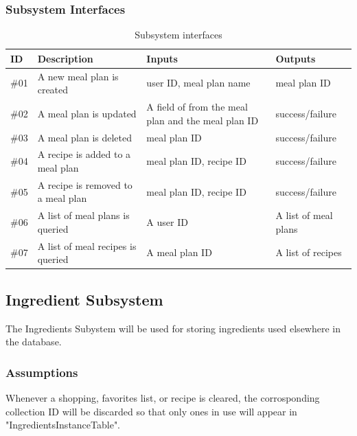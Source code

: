 \subsubsection{Subsystem Interfaces}
\begin {table}[H]
\caption {Subsystem interfaces} 
\begin{center}
    \begin{tabular}{ | p{1cm} | p{6cm} | p{3cm} | p{3cm} |}
    \hline
    ID & Description & Inputs & Outputs \\ \hline
    \#01 & A new meal plan is created & user ID, meal plan name & meal plan ID  \\ \hline
    \#02 & A meal plan is updated & A field of from the meal plan and the meal plan ID & success/failure  \\ \hline
    \#03 & A meal plan is deleted & meal plan ID & success/failure  \\ \hline
    \#04 & A recipe is added to a meal plan & meal plan ID, recipe ID & success/failure  \\ \hline
    \#05 & A recipe is removed to a meal plan & meal plan ID, recipe ID & success/failure  \\ \hline
    \#06 & A list of meal plans is queried & A user ID & A list of meal plans  \\ \hline
    \#07 & A list of meal recipes is queried & A meal plan ID & A list of recipes  \\ \hline
    \end{tabular}
\end{center}
\end{table}


\subsection{Ingredient Subsystem}\label{section:db.3}
The Ingredients Subystem will be used for storing ingredients used elsewhere in the database.


\subsubsection{Assumptions}
Whenever a shopping, favorites list, or recipe is cleared, the corrosponding collection ID will be discarded so that only ones in use will appear in "IngredientsInstanceTable".

